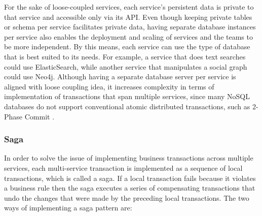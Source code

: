 \documentclass{Configuration_Files/PoliMi3i_thesis}
\begin{document}
For the sake of loose-coupled services, each service’s persistent data is private to that service and accessible only via its API.
Even though keeping private tables or schema per service facilitates private data, having separate database instances per service also enables the deployment and scaling of services and the teams to be more independent.
By this means, each service can use the type of database that is best suited to its needs.
For example, a service that does text searches could use ElasticSearch, while
another service that manipulates a social graph could use Neo4j.
Although having a separate database server per service is aligned with loose coupling idea, it increases complexity in terms of implementation of transactions that span multiple services, since many NoSQL databases do not support conventional atomic distributed transactions, such as 2-Phase Commit \cite{twopc}.

\subsubsection{Saga}
\label{subsubsec:saga}

In order to solve the issue of implementing business transactions across multiple services, each multi-service transaction is implemented as a sequence of local transactions, which is called a saga.
If a local transaction fails because it violates a business rule then the saga executes a series of compensating transactions that undo the changes that were made by the preceding local transactions.
The two ways of implementing a saga pattern are:
\end{document}
